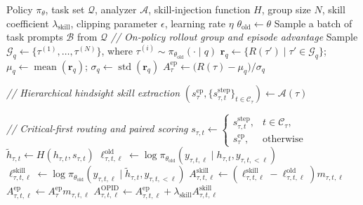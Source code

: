 \documentclass{llmxive}
\begin{document}
\begin{algorithm}[t]
\caption{OPID: On-Policy Skill Distillation}
\label{alg:opid}
\footnotesize
\begin{algorithmic}[1]
\Require Policy $\pi_\theta$, task set $\mathcal{Q}$, analyzer $\mathcal{A}$,
skill-injection function $H$, group size $N$, skill coefficient
$\lambda_{\mathrm{skill}}$, clipping parameter $\epsilon$, learning rate $\eta$
    \State $\theta_{\mathrm{old}} \gets \theta$
    \State Sample a batch of task prompts $\mathcal{B}$ from $\mathcal{Q}$
        \State \textit{// On-policy rollout group and episode advantage}
        \State Sample $\mathcal{G}_q \gets \{\tau^{(1)},\ldots,\tau^{(N)}\}$,
        where $\tau^{(i)} \sim \pi_{\theta_{\mathrm{old}}}(\cdot\mid q)$
        \State $\mathbf{r}_q \gets \{R(\tau')\mid \tau'\in\mathcal{G}_q\}$;
        $\mu_q \gets \operatorname{mean}(\mathbf{r}_q)$;
        $\sigma_q \gets \operatorname{std}(\mathbf{r}_q)$
            \State $A^{\mathrm{ep}}_{\tau} \gets
            \bigl(R(\tau)-\mu_q\bigr)/\sigma_q$

            \State \textit{// Hierarchical hindsight skill extraction}
            \State $\left(s^{\mathrm{ep}}_{\tau},
            \{s^{\mathrm{step}}_{\tau,t}\}_{t\in\mathcal{C}_{\tau}}\right)
            \gets \mathcal{A}(\tau)$

            \State \textit{// Critical-first routing and paired scoring}
                \State $s_{\tau,t} \gets
                \begin{cases}
                    s^{\mathrm{step}}_{\tau,t}, & t\in\mathcal{C}_{\tau},\\
                    s^{\mathrm{ep}}_{\tau}, & \text{otherwise}
                \end{cases}$
                \State $\tilde{h}_{\tau,t} \gets H(h_{\tau,t},s_{\tau,t})$
                    \State $\ell^{\mathrm{old}}_{\tau,t,\ell} \gets
                    \log\pi_{\theta_{\mathrm{old}}}
                    (y_{\tau,t,\ell}\mid h_{\tau,t},y_{\tau,t,<\ell})$
                    \State $\ell^{\mathrm{skill}}_{\tau,t,\ell} \gets
                    \log\pi_{\theta_{\mathrm{old}}}
                    (y_{\tau,t,\ell}\mid \tilde{h}_{\tau,t},y_{\tau,t,<\ell})$
                    \State $A^{\mathrm{skill}}_{\tau,t,\ell} \gets
                    (\ell^{\mathrm{skill}}_{\tau,t,\ell}
                    -\ell^{\mathrm{old}}_{\tau,t,\ell})m_{\tau,t,\ell}$
                    \State $A^{\mathrm{ep}}_{\tau,t,\ell} \gets
                    A^{\mathrm{ep}}_{\tau}m_{\tau,t,\ell}$
                    \State $A^{\mathrm{OPID}}_{\tau,t,\ell} \gets
                    A^{\mathrm{ep}}_{\tau,t,\ell}
                    +\lambda_{\mathrm{skill}}A^{\mathrm{skill}}_{\tau,t,\ell}$
                \EndFor
            \EndFor
        \EndFor
    \EndFor


\end{algorithmic}
\end{algorithm}
\end{document}
